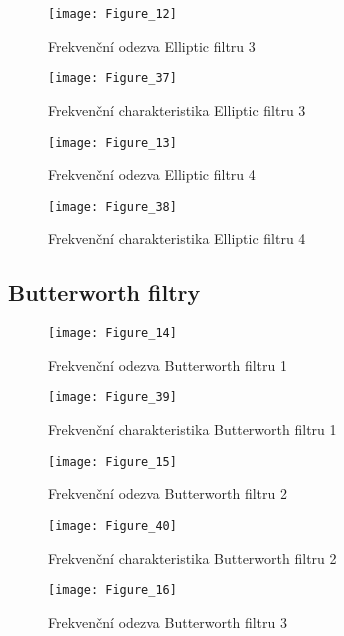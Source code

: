 \begin{figure}[H] 
	\centering
	\texttt{[image: Figure\_12]}
	\caption{Frekvenční odezva Elliptic filtru 3}
\end{figure}

\begin{figure}[H] 
	\centering
	\texttt{[image: Figure\_37]}
	\caption{Frekvenční charakteristika Elliptic filtru 3}
\end{figure}

\begin{figure}[H] 
	\centering
	\texttt{[image: Figure\_13]}
	\caption{Frekvenční odezva Elliptic filtru 4}
\end{figure}

\begin{figure}[H] 
	\centering
	\texttt{[image: Figure\_38]}
	\caption{Frekvenční charakteristika Elliptic filtru 4}
\end{figure}

\subsection{Butterworth filtry}
\begin{figure}[H] 
	\centering
	\texttt{[image: Figure\_14]}
	\caption{Frekvenční odezva Butterworth filtru 1}
\end{figure}

\begin{figure}[H] 
	\centering
	\texttt{[image: Figure\_39]}
	\caption{Frekvenční charakteristika Butterworth filtru 1}
\end{figure}

\begin{figure}[H] 
	\centering
	\texttt{[image: Figure\_15]}
	\caption{Frekvenční odezva Butterworth filtru 2}
\end{figure}

\begin{figure}[H] 
	\centering
	\texttt{[image: Figure\_40]}
	\caption{Frekvenční charakteristika Butterworth filtru 2}
\end{figure}

\begin{figure}[H] 
	\centering
	\texttt{[image: Figure\_16]}
	\caption{Frekvenční odezva Butterworth filtru 3}
\end{figure}

